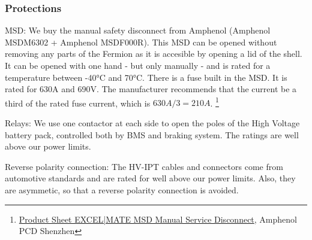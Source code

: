 \subsubsection*{Protections}
\par MSD: We buy the manual safety disconnect from Amphenol (Amphenol MSDM6302 + Amphenol MSDF000R). This MSD can be opened without removing any parts of the Fermion as it is accesible by opening a lid of the shell. It can be opened with one hand - but only manually - and is rated for a temperature between -40°C and 70°C. There is a fuse built in the MSD. It is rated for 630A and 690V. The manufacturer recommends that the current be a third of the rated fuse current, which is \(630A/3 = 210A\). \footnote{\href{https://www.amphenol-industrial.de/de/amph/download/viewFile/MTA0}{Product Sheet EXCEL|MATE MSD
Manual Service Disconnect}, Amphenol PCD Shenzhen} \\
\par Relays: We use one contactor at each side to open the poles of the High Voltage battery pack, controlled both by BMS and braking system. The ratings are well above our power limits.
\par Reverse polarity connection: The HV-IPT cables and connectors come from automotive standards and are rated for well above our power limits. Also, they are asymmetic, so that a reverse polarity connection is avoided. 
